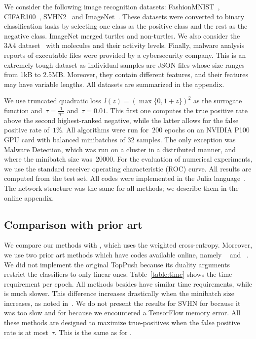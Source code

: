 We consider the following image recognition datasets: FashionMNIST~\cite{xiao2017fashionmnist}, CIFAR100~\cite{krizhevsky2009learning}, SVHN2~\cite{netzer2011reading} and ImageNet~\cite{russakovsky2015imagenet}. These datasets were converted to binary classification tasks by selecting one class as the positive class and the rest as the negative class. ImageNet merged turtles and non-turtles. We also consider the 3A4 dataset~\cite{ma2015deep} with molecules and their activity levels. Finally, malware analysis reports of executable files were provided by a cybersecurity company. This is an extremely tough dataset as individual samples are JSON files whose size ranges from 1kB to 2.5MB. Moreover, they contain different features, and their features may have variable lengths. All datasets are summarized in the appendix.

We use truncated quadratic loss~$l(z) = (\max\{0, 1 + z\})^2$ as the surrogate function and~$\tau=\frac{1}{n^-}$ and~$\tau=0.01$. This first one computes the true positive rate above the second highest-ranked negative, while the latter allows for the false positive rate of~$1\%$. All algorithms were run for~$200$ epochs on an NVIDIA P100 GPU card with balanced minibatches of 32 samples. The only exception was Malware Detection, which was run on a cluster in a distributed manner, and where the minibatch size was~$20000$. For the evaluation of numerical experiments, we use the standard receiver operating characteristic (ROC) curve. All results are computed from the test set. All codes were implemented in the Julia language~\cite{bezanson2017julia}. The network structure was the same for all methods; we describe them in the online appendix.

\subsection{Comparison with prior art}\label{sec:comparison}

We compare our methods with \BaseLine, which uses the weighted cross-entropy. Moreover, we use two prior art methods which have codes available online, namely \TFCO~\cite{cotter2019optimization,narasimhan2019optimizing} and \APPerf~\cite{fathony2019ap}. We did not implement the original TopPush because its duality arguments restrict the classifiers to only linear ones. Table~\ref{table:time} shows the time requirement per epoch. All methods besides \APPerf have similar time requirements, while \APPerf is much slower. This difference increases drastically when the minibatch size increases, as noted in~\cite{fathony2019ap}. We do not present the results for SVHN for \APPerf because it was too slow and for \TFCO because we encountered a TensorFlow memory error. All these methods are designed to maximize true-positives when the false positive rate is at most~$\tau$. This is the same as for \PatMatNP.

